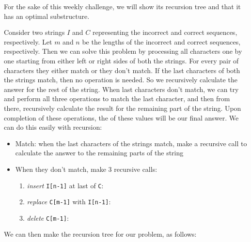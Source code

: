 \documentclass[addpoints]{exam}
\begin{document}
\begin{questions}
\begin{solution}
      For the sake of this weekly challenge, we will show its recursion tree and that it has an optimal substructure. 
      
      \pagebreak
      Consider two strings $I$ and $C$ representing the incorrect and correct sequences, respectively. Let $m$ and $n$ be the lengths of the incorrect and correct sequences, respectively. Then we can solve this problem by processing all characters one by one starting from either left or right sides of both the strings. For every pair of characters they either match or they don't match. If the last characters of both the strings match, then no operation is needed. So we recursively calculate the answer for the rest of the string. When last characters don't match, we can try and perform all three operations to match the last character, and then from there, recursively calculate the result for the remaining part of the string. Upon completion of these operations, the  of these values will be our final answer. We can do this easily with recursion: 
      \begin{itemize}
        \item Match: when the last characters of the strings match, make a recursive call  to calculate the answer to the remaining parts of the string \vspace*{-2mm}
        \item When they don't match, make 3 recursive calls: \begin{enumerate} \vspace*{-2mm}
          \item \textit{insert} \texttt{I[n-1]} at last of \texttt{C}:  \vspace*{-2mm}
          \item \textit{replace} \texttt{C[m-1]} with \texttt{I[n-1]}:  \vspace*{-2mm}
          \item \textit{delete} \texttt{C[m-1]}: 
        \end{enumerate}
      \end{itemize} 
      
      We can then make the recursion tree for our problem,  as follows:


\end{solution}
\end{questions}
\end{document}
